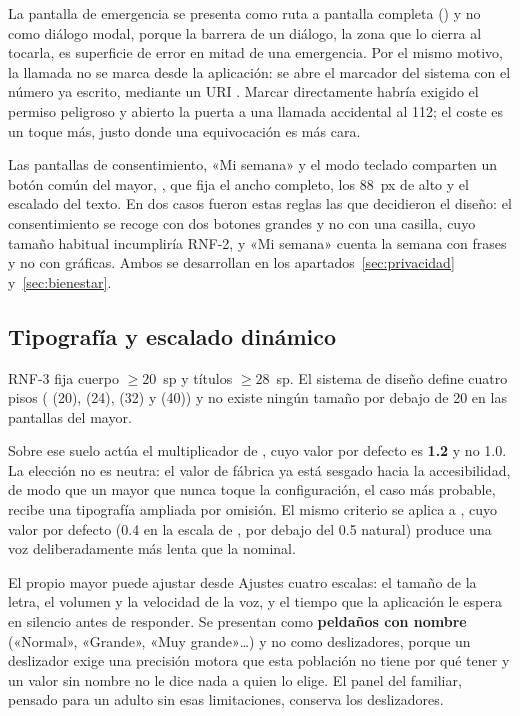 La pantalla de emergencia se presenta como ruta a pantalla completa () y no como
diálogo modal, porque la barrera de un diálogo, la zona que lo cierra al tocarla, es superficie de error en
mitad de una emergencia. Por el mismo motivo, la llamada no se marca desde la aplicación: se abre el
marcador del sistema con el número ya escrito, mediante un URI . Marcar directamente habría
exigido el permiso peligroso  y abierto la puerta a una llamada accidental al 112; el coste
es un toque más, justo donde una equivocación es más cara.

Las pantallas de consentimiento, «Mi semana» y el modo teclado comparten un botón común del mayor,
, que fija el ancho completo, los 88~px de alto y el escalado del texto. En dos casos
fueron estas reglas las que decidieron el diseño: el consentimiento se recoge con dos botones grandes y no
con una casilla, cuyo tamaño habitual incumpliría RNF-2, y «Mi semana» cuenta la semana con frases y no con
gráficas. Ambos se desarrollan en los apartados~\ref{sec:privacidad} y~\ref{sec:bienestar}.

\subsection{Tipografía y escalado dinámico}

RNF-3 fija cuerpo $\geq 20$~sp y títulos $\geq 28$~sp. El sistema de diseño define cuatro pisos
( (20),  (24),  (32) y  (40)) y no
existe ningún tamaño por debajo de 20 en las pantallas del mayor.

Sobre ese suelo actúa el multiplicador  de , cuyo valor por
defecto es \textbf{1.2} y no 1.0. La elección no es neutra: el valor de fábrica ya está sesgado hacia la
accesibilidad, de modo que un mayor que nunca toque la configuración, el caso más probable, recibe una
tipografía ampliada por omisión. El mismo criterio se aplica a , cuyo valor por defecto
(0.4 en la escala de , por debajo del 0.5 natural) produce una voz deliberadamente más
lenta que la nominal.

El propio mayor puede ajustar desde Ajustes cuatro escalas: el tamaño de la letra, el volumen y la velocidad
de la voz, y el tiempo que la aplicación le espera en silencio antes de responder. Se presentan como
\textbf{peldaños con nombre} («Normal», «Grande», «Muy grande»\ldots) y no como deslizadores, porque un
deslizador exige una precisión motora que esta población no tiene por qué tener y un valor sin nombre no le
dice nada a quien lo elige. El panel del familiar, pensado para un adulto sin esas limitaciones, conserva
los deslizadores.

